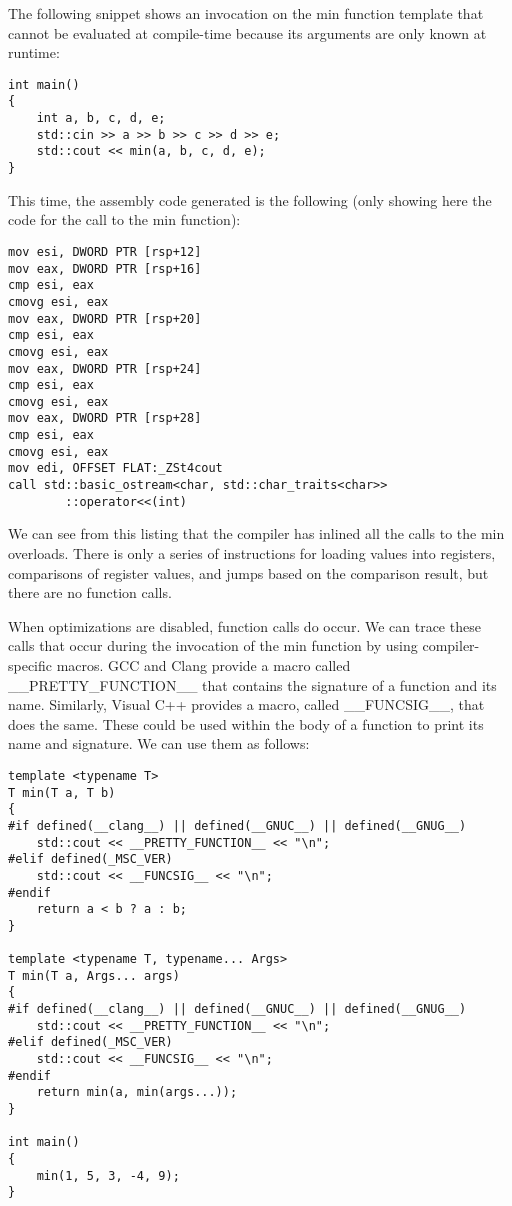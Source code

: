 The following snippet shows an invocation on the min function template that cannot be evaluated at compile-time because its arguments are only known at runtime:

\begin{lstlisting}[style=styleCXX]
int main()
{
	int a, b, c, d, e;
	std::cin >> a >> b >> c >> d >> e;
	std::cout << min(a, b, c, d, e);
}
\end{lstlisting}

This time, the assembly code generated is the following (only showing here the code for the call to the min function):

\begin{lstlisting}[style=styleCXX]
mov esi, DWORD PTR [rsp+12]
mov eax, DWORD PTR [rsp+16]
cmp esi, eax
cmovg esi, eax
mov eax, DWORD PTR [rsp+20]
cmp esi, eax
cmovg esi, eax
mov eax, DWORD PTR [rsp+24]
cmp esi, eax
cmovg esi, eax
mov eax, DWORD PTR [rsp+28]
cmp esi, eax
cmovg esi, eax
mov edi, OFFSET FLAT:_ZSt4cout
call std::basic_ostream<char, std::char_traits<char>>
        ::operator<<(int)
\end{lstlisting}

We can see from this listing that the compiler has inlined all the calls to the min overloads. There is only a series of instructions for loading values into registers, comparisons of register values, and jumps based on the comparison result, but there are no function calls.

When optimizations are disabled, function calls do occur. We can trace these calls that occur during the invocation of the min function by using compiler-specific macros. GCC and Clang provide a macro called \_\_PRETTY\_FUNCTION\_\_ that contains the signature of a function and its name. Similarly, Visual C++ provides a macro, called \_\_FUNCSIG\_\_, that does the same. These could be used within the body of a function to print its name and signature. We can use them as follows:


\begin{lstlisting}[style=styleCXX]
template <typename T>
T min(T a, T b)
{
#if defined(__clang__) || defined(__GNUC__) || defined(__GNUG__)
	std::cout << __PRETTY_FUNCTION__ << "\n";
#elif defined(_MSC_VER)
	std::cout << __FUNCSIG__ << "\n";
#endif
	return a < b ? a : b;
}

template <typename T, typename... Args>
T min(T a, Args... args)
{
#if defined(__clang__) || defined(__GNUC__) || defined(__GNUG__)
	std::cout << __PRETTY_FUNCTION__ << "\n";
#elif defined(_MSC_VER)
	std::cout << __FUNCSIG__ << "\n";
#endif
	return min(a, min(args...));
}

int main()
{
	min(1, 5, 3, -4, 9);
}
\end{lstlisting}

